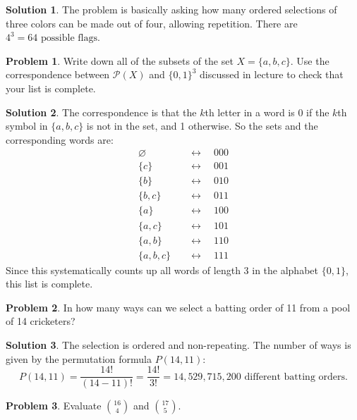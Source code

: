 \documentclass[12pt,a4paper]{article}
\numberwithin{equation}{section}
\theoremstyle{plain}
\theoremstyle{definition}
\newtheorem{problem}{Problem}
\theoremstyle{solutionstyle}
\newtheorem*{solution*}{Solution} %
\theoremstyle{definition} %
\newcommand{\Ps}{\mathcal P}
\let\emptyset\varnothing
\begin{document}
	\begin{solution*}
		The problem is basically asking how many ordered selections of three colors can be made out of four, allowing repetition. There are $\boxed{4^3 = 64 \textrm{ possible flags.}}$
	\end{solution*}
	
	\begin{problem}
		Write down all of the subsets of the set $X = \{a,b,c\}$. Use the correspondence between $\Ps(X)$ and $\{0,1\}^3$ discussed in lecture to check that your list is complete. 
	\end{problem}
	
	\begin{solution*}
		The correspondence is that the $k$th letter in a word is 0 if the $k$th symbol in $\{a,b,c\}$ is not in the set, and 1 otherwise. So the sets and the corresponding words are: 
		\[
		\boxed{\begin{aligned}
				\emptyset \quad &\longleftrightarrow \quad 000 \\
				\{c\} \quad &\longleftrightarrow \quad 001 \\
				\{b\} \quad &\longleftrightarrow \quad 010 \\
				\{b,c\} \quad &\longleftrightarrow \quad 011 \\
				\{a\} \quad &\longleftrightarrow \quad 100 \\
				\{a,c\} \quad &\longleftrightarrow \quad 101 \\
				\{a,b\} \quad &\longleftrightarrow \quad 110 \\
				\{a,b,c\} \quad &\longleftrightarrow \quad 111
		\end{aligned}}
		\]
		Since this systematically counts up all words of length 3 in the alphabet $\{0,1\}$, this list is complete. 
	\end{solution*}
	
	\begin{problem}
		In how many ways can we select a batting order of 11 from a pool of 14 cricketers? 
	\end{problem}
	
	\begin{solution*}
		The selection is ordered and non-repeating. The number of ways is given by the permutation formula $P(14, 11)$: 
		\[
		P(14, 11) = \frac{14!}{(14-11)!} = \boxed{\frac{14!}{3!} = 14,529,715,200 \textrm{ different batting orders.}}
		\]
	\end{solution*}
	
	\begin{problem}
		Evaluate $\binom{16}4$ and $\binom{17}5$. 
	\end{problem}
	
\end{document}
